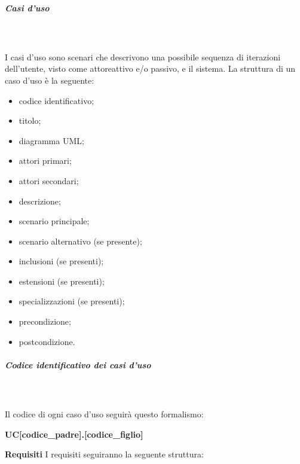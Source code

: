 				\subparagraph*{Casi d'uso} \mbox{} \\ \mbox{} \\
				I casi d'uso sono scenari che descrivono una possibile sequenza di iterazioni dell'utente, visto come attore\glo attivo e/o passivo, e il sistema. La struttura di un caso d'uso è la seguente:
				\begin{itemize}
					\item codice identificativo;
					\item titolo;
					\item diagramma UML\glo;
					\item attori primari;
					\item attori secondari;
					\item descrizione;
					\item scenario principale;
					\item scenario alternativo (se presente);
					\item inclusioni (se presenti);
					\item estensioni (se presenti);
					\item specializzazioni (se presenti);
					\item precondizione;
					\item postcondizione. 
				\end{itemize}
				\subparagraph*{Codice identificativo dei casi d'uso} \mbox{} \\ \mbox{} \\
			Il codice di ogni caso d'uso seguirà questo formalismo: \newline \newline
			\centerline{\textbf{UC[codice\_padre].[codice\_figlio]}} \newline \newline
			\textbf{Requisiti} \newline \newline
			I requisiti seguiranno la seguente struttura:
